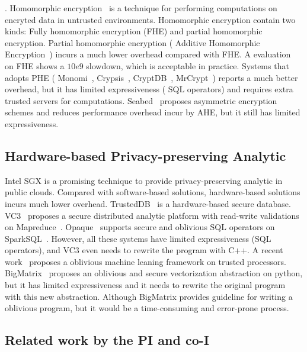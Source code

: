 . Homomorphic 
encryption~\cite{fullmomo:stoc09,paillier,elgamal} is a
technique for performing computations on encryted data in untrusted 
environments. Homomorphic encryption contain two kinds: Fully 
homomorphic encryption (FHE) and partial 
homomorphic encryption.
Partial homomorphic encryption (\eg{} Additive Homomorphic 
Encryption~\cite{paillier})
incurs a much lower overhead compared with FHE. A evaluation~\cite{homo:eval} on
FHE shows a $10e9$ slowdown, which is acceptable in practice.
Systems that adopts PHE (\eg{} Monomi~\cite{monomi:vldb13},
Crypsis~\cite{crypsis:hotcloud14}, CryptDB~\cite{cryptdb:sosp11},
MrCrypt~\cite{mrcrypt:oospsla14})
reports a much better overhead, but it has limited expressiveness
(\eg{} SQL operators) and requires extra trusted servers for computations.
Seabed~\cite{seabed:osdi16} proposes asymmetric encryption schemes and reduces 
performance overhead
incur by AHE, but it still has limited expressiveness.

\subsection{Hardware-based Privacy-preserving Analytic}
Intel SGX is a promising technique to provide privacy-preserving analytic
in public clouds. Compared with software-based solutions, hardware-based 
solutions
incurs much lower overhead. TrustedDB~\cite{trusteddb:sigmod11} is a
hardware-based secure database.
VC3~\cite{vc3:sp15} proposes a secure distributed analytic platform
with read-write validations on Mapreduce~\cite{mapreduce}. 
Opaque~\cite{opaque:nsdi17}
supports secure and oblivious SQL operators on 
SparkSQL~\cite{sparksql:sigmod15}.
However, all these systems have limited expressiveness (\eg SQL operators), and
VC3 even needs to rewrite the program with C++. A recent 
work~\cite{oblivious:security16} proposes a oblivious machine leaning
framework on trusted processors.
BigMatrix~\cite{bigmatrix:ccs17} proposes an oblivious and secure vectorization
abstraction on python, but it has limited expressiveness and it needs to
rewrite the original program with this new abstraction.
Although BigMatrix provides guideline for
writing a oblivious program, but it would be a time-consuming and error-prone
process.

\vspace{-.15in}\subsection{Related work by the PI and co-I} 
\label{sec:my-work}\vspace{-.075in}
% 

